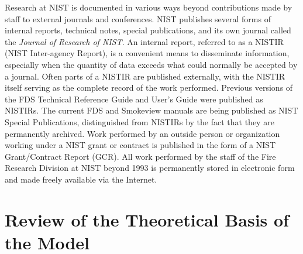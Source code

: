 \documentclass[11pt]{book}
\begin{document}
Research at NIST is documented in various ways beyond contributions made by staff to external journals and conferences. NIST publishes several forms of internal reports, technical notes, special publications, and its own journal called the {\em Journal of Research of NIST}. An internal report, referred to as a NISTIR (NIST Inter-agency Report), is a convenient means to disseminate information, especially when the quantity of data exceeds what could normally be accepted by a journal. Often parts of a NISTIR are published externally, with the NISTIR itself serving as the complete record of the work performed. Previous versions of the FDS Technical Reference Guide and User's Guide were published as NISTIRs. The current FDS and Smokeview manuals are being published as NIST Special Publications, distinguished from NISTIRs by the fact that they are permanently archived. Work performed by an outside person or organization working under a NIST grant or contract is published in the form of a NIST Grant/Contract Report (GCR). All work performed by the staff of the Fire Research Division at NIST beyond 1993 is permanently stored in electronic form and made freely available via the Internet.




\section{Review of the Theoretical Basis of the Model}
\label{JustAA}
\end{document}
